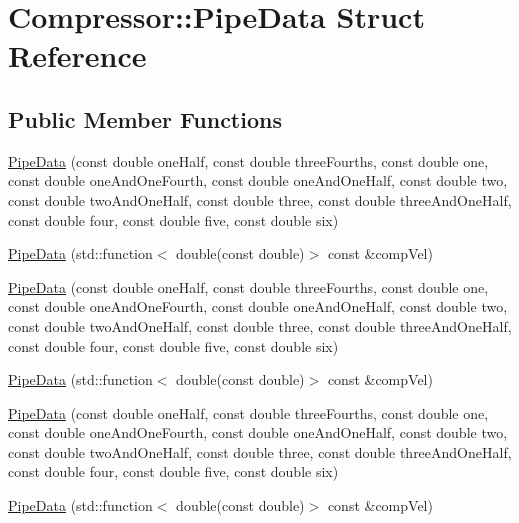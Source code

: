 \hypertarget{struct_compressor_1_1_pipe_data}{}\section{Compressor\+:\+:Pipe\+Data Struct Reference}
\label{struct_compressor_1_1_pipe_data}
\subsection*{Public Member Functions}
\begin{DoxyCompactItemize}
\item 
\hyperlink{struct_compressor_1_1_pipe_data_a71acdc81e25bd90b51361bf8d4f0ed38}{Pipe\+Data} (const double one\+Half, const double three\+Fourths, const double one, const double one\+And\+One\+Fourth, const double one\+And\+One\+Half, const double two, const double two\+And\+One\+Half, const double three, const double three\+And\+One\+Half, const double four, const double five, const double six)
\item 
\hyperlink{struct_compressor_1_1_pipe_data_af7998fd533340b0a84e78fcda91b4806}{Pipe\+Data} (std\+::function$<$ double(const double)$>$ const \&comp\+Vel)
\item 
\hyperlink{struct_compressor_1_1_pipe_data_a71acdc81e25bd90b51361bf8d4f0ed38}{Pipe\+Data} (const double one\+Half, const double three\+Fourths, const double one, const double one\+And\+One\+Fourth, const double one\+And\+One\+Half, const double two, const double two\+And\+One\+Half, const double three, const double three\+And\+One\+Half, const double four, const double five, const double six)
\item 
\hyperlink{struct_compressor_1_1_pipe_data_af7998fd533340b0a84e78fcda91b4806}{Pipe\+Data} (std\+::function$<$ double(const double)$>$ const \&comp\+Vel)
\item 
\hyperlink{struct_compressor_1_1_pipe_data_a71acdc81e25bd90b51361bf8d4f0ed38}{Pipe\+Data} (const double one\+Half, const double three\+Fourths, const double one, const double one\+And\+One\+Fourth, const double one\+And\+One\+Half, const double two, const double two\+And\+One\+Half, const double three, const double three\+And\+One\+Half, const double four, const double five, const double six)
\item 
\hyperlink{struct_compressor_1_1_pipe_data_af7998fd533340b0a84e78fcda91b4806}{Pipe\+Data} (std\+::function$<$ double(const double)$>$ const \&comp\+Vel)
\end{DoxyCompactItemize}

